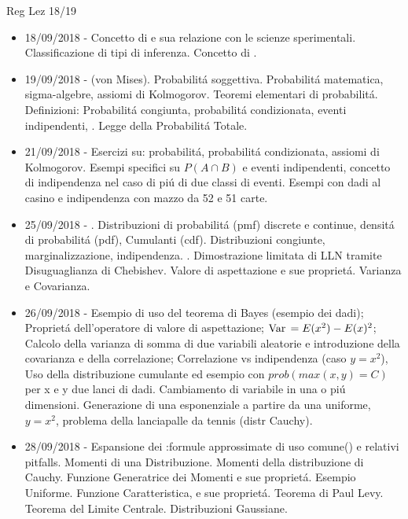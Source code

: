 
\begin{frame}[allowframebreaks]{Reg Lez 18/19}
\cite{reg18}
\listofkeywords
\begin{itemize}
    \item 18/09/2018 - Concetto di  e sua relazione con le scienze sperimentali. Classificazione di tipi di inferenza. Concetto di .
    
    \item 19/09/2018 -  (von Mises). Probabilit\'a soggettiva. Probabilit\'a matematica, sigma-algebre, assiomi di Kolmogorov. Teoremi elementari di probabilit\'a. Definizioni: Probabilit\'a congiunta, probabilit\'a condizionata, eventi indipendenti, . Legge della Probabilit\'a Totale.
    
    \item 21/09/2018 - Esercizi su: probabilit\'a, probabilit\'a condizionata, assiomi di Kolmogorov. Esempi specifici su $P(A \cap B)$ e eventi indipendenti, concetto di indipendenza nel caso di pi\'u di due classi di eventi. Esempi con dadi al casino e indipendenza con mazzo da 52 e 51 carte.
    
    \item 25/09/2018 - . Distribuzioni di probabilit\'a (pmf) discrete e continue, densit\'a di probabilit\'a (pdf), Cumulanti (cdf). Distribuzioni congiunte, marginalizzazione, indipendenza. . Dimostrazione limitata di LLN tramite Disuguaglianza di Chebishev. Valore di aspettazione e sue propriet\'a. Varianza e Covarianza.
    
    \item 26/09/2018 - Esempio di uso del teorema di Bayes (esempio dei dadi); Propriet\'a dell'operatore di valore di aspettazione; $\operatorname{Var}{}=E(x^2)-E(x)^2$; Calcolo della varianza di somma di due variabili aleatorie e introduzione della covarianza e della correlazione; Correlazione vs indipendenza (caso $y=x^2$), Uso della distribuzione cumulante ed esempio con $prob(max(x,y)=C)$ per x e y due lanci di dadi. Cambiamento di variabile in una o pi\'u dimensioni. Generazione di una esponenziale a partire da una uniforme, $y=x^2$, problema della lanciapalle da tennis (distr Cauchy).
    
    \item 28/09/2018 - Espansione dei :formule approssimate di uso comune() e relativi pitfalls. Momenti di una Distribuzione. Momenti della distribuzione di Cauchy. Funzione Generatrice dei Momenti e sue propriet\'a. Esempio Uniforme. Funzione Caratteristica, e sue propriet\'a. Teorema di Paul Levy. Teorema del Limite Centrale. Distribuzioni Gaussiane.
    

\end{itemize}
\end{frame}
